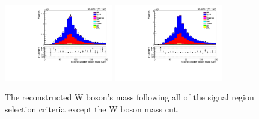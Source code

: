 \begin{figure}[ht]
\centering
\includegraphics[width=0.42\textwidth]{figs/background-estimation/plots/unblinded/prompt_ee_ttbarInc/wPairMass_NPL_ee_bTag_ee.pdf}
\includegraphics[width=0.42\textwidth]{figs/background-estimation/plots/unblinded/prompt_mumu_ttbarInc/wPairMass_NPL_mumu_bTag_mumu.pdf}
\caption{
The reconstructed W boson's mass following all of the signal region selection criteria except the W boson mass cut.
}
\label{fig:SR_wMass}
\end{figure}

